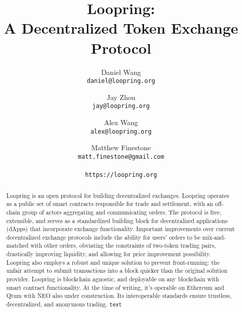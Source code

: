 \documentclass[UTF8,nofonts]{article}
\title{\textbf{Loopring:}\\\textbf{A Decentralized Token Exchange Protocol}}
\author{
  Daniel Wang\\
  \texttt{daniel@loopring.org}\\
  \and
  	Jay Zhou\\
  	\texttt{jay@loopring.org}\\
  	\and
  	Alex Wang\\
  	\texttt{alex@loopring.org}\\
  	\and
  	Matthew Finestone\\
  	\texttt{matt.finestone@gmail.com}\\ 
  \\
  \texttt{https://loopring.org}
 }
\begin{document}
\maketitle


\begin{abstract}
Loopring is an open protocol for building decentralized exchanges. Loopring operates as a public set of smart contracts responsible for trade and settlement, with an off-chain group of actors aggregating and communicating orders. The protocol is free, extensible, and serves as a standardized building block for decentralized applications (dApps) that incorporate exchange functionality. Important improvements over current decentralized exchange protocols include the ability for users' orders to be mix-and-matched with other orders, obviating the constraints of two-token trading pairs, drastically improving liquidity, and allowing for price improvement possibility. Loopring also employs a robust and unique solution to prevent front-running: the unfair attempt to submit transactions into a block quicker than the original solution provider. Loopring is blockchain agnostic, and deployable on any blockchain with smart contract functionality. At the time of writing, it's operable on Ethereum \cite{buterin2017ethereum} \cite{wood2014ethereum} and Qtum \cite{dai2017smart} with NEO \cite{atterlonn2018distributed} also under construction. Its interoperable standards ensure trustless, decentralized, and anonymous trading. \verb|text|
\end{abstract}
\end{document}
